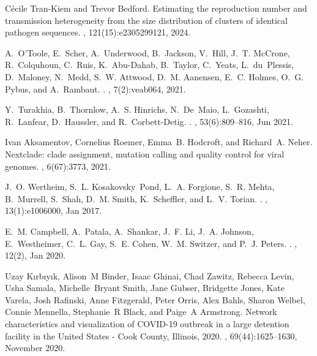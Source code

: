 \documentclass[webpdf,contemporary,large,single]{oup-authoring-template}%
\theoremstyle{thmstyleone}%
\theoremstyle{thmstyletwo}%
\theoremstyle{thmstylethree}%
\begin{document}
\begin{thebibliography}{10}
C{\'e}cile Tran-Kiem and Trevor Bedford.
\newblock Estimating the reproduction number and transmission heterogeneity
  from the size distribution of clusters of identical pathogen sequences.
,
  121(15):e2305299121, 2024.

A.~O'Toole, E.~Scher, A.~Underwood, B.~Jackson, V.~Hill, J.~T. McCrone,
  R.~Colquhoun, C.~Ruis, K.~Abu-Dahab, B.~Taylor, C.~Yeats, L.~du~Plessis,
  D.~Maloney, N.~Medd, S.~W. Attwood, D.~M. Aanensen, E.~C. Holmes, O.~G.
  Pybus, and A.~Rambaut.
.
, 7(2):veab064, 2021.

Y.~Turakhia, B.~Thornlow, A.~S. Hinrichs, N.~De~Maio, L.~Gozashti, R.~Lanfear,
  D.~Haussler, and R.~Corbett-Detig.
.
, 53(6):809--816, Jun 2021.

Ivan Aksamentov, Cornelius Roemer, Emma~B. Hodcroft, and Richard~A. Neher.
\newblock Nextclade: clade assignment, mutation calling and quality control for
  viral genomes.
, 6(67):3773, 2021.

J.~O. Wertheim, S.~L. Kosakovsky~Pond, L.~A. Forgione, S.~R. Mehta, B.~Murrell,
  S.~Shah, D.~M. Smith, K.~Scheffler, and L.~V. Torian.
.
, 13(1):e1006000, Jan 2017.

E.~M. Campbell, A.~Patala, A.~Shankar, J.~F. Li, J.~A. Johnson, E.~Westheimer,
  C.~L. Gay, S.~E. Cohen, W.~M. Switzer, and P.~J. Peters.
.
, 12(2), Jan 2020.

Uzay K{\i}rb{\i}y{\i}k, Alison~M Binder, Isaac Ghinai, Chad Zawitz, Rebecca
  Levin, Usha Samala, Michelle~Bryant Smith, Jane Gubser, Bridgette Jones, Kate
  Varela, Josh Rafinski, Anne Fitzgerald, Peter Orris, Alex Bahls, Sharon
  Welbel, Connie Mennella, Stephanie~R Black, and Paige~A Armstrong.
\newblock Network characteristics and visualization of {COVID-19} outbreak in a
  large detention facility in the {U}nited {S}tates - {C}ook {C}ounty,
  {I}llinois, 2020.
, 69(44):1625--1630, November 2020.


\end{thebibliography}
\end{document}
